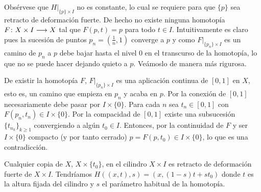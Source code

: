 \documentclass[GTS.tex]{subfiles}
\begin{document}
\begin{ej}
Obsérvese que $H\big|_{\{p\}\times I}$ no es constante, lo cual se requiere para que $\{p\}$ sea retracto de deformación fuerte. De hecho no existe ninguna homotopía $F\colon{X\times I}\longrightarrow{X}$ tal que $F(p,t)=p$ para todo $t\in I$. Intuitivamente es claro pues la sucesión de puntos $p_n=\left(\frac{1}{n},1\right)$ converge a $p$ y como $F\big|_{\{p_n\}\times I}$ es un camino de $p_n$ a $p$  debe bajar hasta el nivel $0$ en el transcurso de la homotopía, lo que no se puede hacer dejando quieto a $p$. Veámoslo de manera más rigurosa.

De existir la homotopía $F$, $F\big|_{\{p_n\}\times I}$ es una aplicación continua de $[0,1]$ en $X$, esto es, un camino que empieza en $p_n$ y acaba en $p$. Por la conexión de $[0,1]$ necesariamente debe pasar por $I\times\{0\}$. Para cada $n$ sea $t_n\in[0,1]$ con $F(p_n,t_n)\in I\times\{0\}$. Por la compacidad de $[0,1]$ existe una subsucesión $\{t_{n_k}\}_{k\geq 1}$ convergiendo a algún $t_0\in I$. Entonces, por la continuidad de $F$ y ser $I\times\{0\}$ compacto (y por tanto cerrado) $p=F(p,t_0)\in I\times\{0\}$, lo que es una contradicción.
\end{ej}

\begin{ej}Cualquier copia de $X$, $X\times\{t_0\}$, en el cilindro $X\times I$ es retracto de deformación fuerte de $X\times I$. Tendríamos $H((x,t),s)=(x,(1-s)t+st_0)$ donde $t$ es la altura fijada del cilindro y $s$ el parámetro habitual de la homotopía.

\begin{center}
\end{center}

\end{ej}
\end{document}
